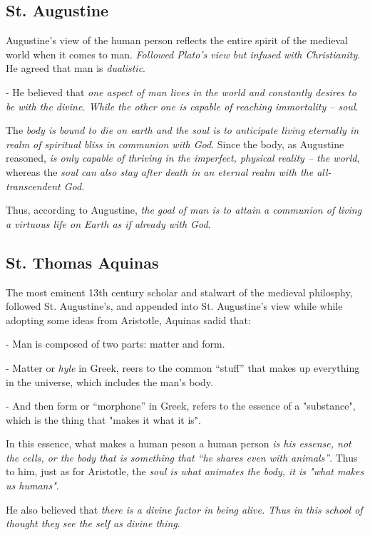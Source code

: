 \documentclass[12pt, UTF8]{article}
\begin{document}
	\subsection*{St. Augustine}
	
	Augustine's view of the human person reflects the entire spirit of the medieval world when it comes to man. \emph{Followed Plato's view but infused with Christianity}. He agreed that man is \textit{dualistic}.
	
	- He believed that \emph{one aspect of man lives in the world and constantly desires to be with the divine. While the other one is capable of reaching immortality -- soul}.
	
	The \textit{body is bound to die on earth and the soul is to anticipate living eternally in realm of spiritual bliss in communion with God}. Since the body, as Augustine reasoned, \emph{is only capable of thriving in the imperfect, physical reality -- the world}, whereas the \textit{soul can also stay after death in an eternal realm with the all-transcendent God}.
	
	Thus, according to Augustine, \emph{the goal of man is to attain a communion of living a virtuous life on Earth as if already with God}.
	
	\subsection*{St. Thomas Aquinas}
	
	The most eminent 13th century scholar and stalwart of the medieval philosphy, followed St. Augustine's, and appended into St. Augustine's view while while adopting some ideas from Aristotle, Aquinas sadid that:
	
	- Man is composed of two parts: matter and form.
	
	- Matter or \textit{hyle} in Greek, reers to the common ``stuff'' that makes up everything in the universe, which includes the man's body.
	
	- And then form or ``morphone'' in Greek, refers to the essence of a "substance", which is the thing that "makes it what it is".
	
	In this essence, what makes a human peson a human person \emph{is his essense, not the cells, or the body that is something that ``he shares even with animals''}. Thus to him, just as for Aristotle, the \emph{soul is what animates the body, it is "what makes us humans"}.
	
	He also believed that \emph{there is a divine factor in being alive. Thus in this school of thought they see the self as divine thing}.
	
\end{document}
